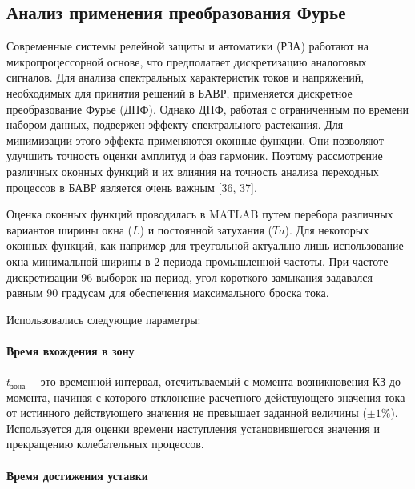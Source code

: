 
\subsection{Анализ применения преобразования Фурье}
\label{sec:ch02_fourier_theory}

Современные системы релейной защиты и автоматики (РЗА) работают на микропроцессорной основе, что предполагает дискретизацию аналоговых сигналов. Для анализа спектральных характеристик токов и напряжений, необходимых для принятия решений в БАВР, применяется дискретное преобразование Фурье (ДПФ). Однако ДПФ, работая с ограниченным по времени набором данных, подвержен эффекту спектрального растекания. Для минимизации этого эффекта применяются оконные функции. Они позволяют улучшить точность оценки амплитуд и фаз гармоник. Поэтому рассмотрение различных оконных функций и их влияния на точность анализа переходных процессов в БАВР является очень важным [36, 37].

Оценка оконных функций проводилась в MATLAB путем перебора различных вариантов ширины окна ($L$) и постоянной затухания ($Ta$). Для некоторых оконных функций, как например для треугольной актуально лишь использование окна минимальной ширины в 2 периода промышленной частоты. При частоте дискретизации 96 выборок на период, угол короткого замыкания задавался равным 90 градусам для обеспечения максимального броска тока.

Использовались следующие параметры:

\paragraph{Время вхождения в зону}

$t_{\text{зона}}$~-- это временной интервал, отсчитываемый с момента возникновения КЗ до момента, начиная с которого отклонение расчетного действующего значения тока от истинного действующего значения не превышает заданной величины ($\pm 1\%$). Используется для оценки времени наступления установившегося значения и прекращению колебательных процессов.

\paragraph{Время достижения уставки}

